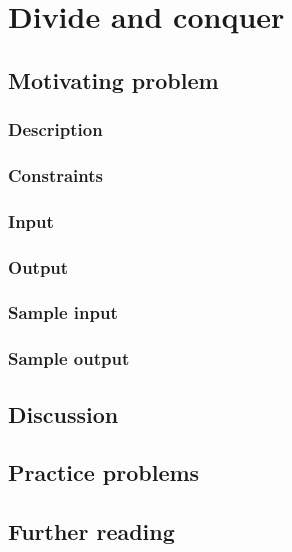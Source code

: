 \section{Divide and conquer}

\subsection*{Motivating problem}

\subsubsection*{Description}

\subsubsection*{Constraints}

\subsubsection*{Input}

\subsubsection*{Output}

\subsubsection*{Sample input}

\subsubsection*{Sample output}

\subsection*{Discussion}

\subsection*{Practice problems}

\subsection*{Further reading}
